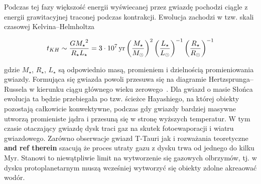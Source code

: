 Podczas tej fazy większość energii wyświecanej przez gwiazdę pochodzi ciągle z
energii grawitacyjnej traconej podczas kontrakcji. Ewolucja zachodzi w tzw.
skali czasowej Kelvina--Helmholtza 

\begin{equation} 
   t_{KH} \sim  \frac{G{M_{\star}}^2}{R_{\star}L_{\star}} = 3\cdot 10^7 \hbox{$\thinspace\textrm{yr}$}
   \left(\frac{M_\star}{M_\odot}\right)^{2}
   \left(\frac{L_\star}{L_\odot}\right)^{-1}
   \left(\frac{R_\star}{R_\odot}\right)^{-1}
\end{equation}

gdzie $M_{\star}$, $R_{\star}$, $L_{\star}$ są odpowiednio masą, promieniem i
dzielnością promieniowania gwiazdy. Formująca się gwiazda powoli przesuwa się na
diagramie Hertzsprunga--Russela w kierunku ciągu głównego wieku
zerowego~\cite{palla}.  Dla gwiazd o masie Słońca ewolucja ta będzie przebiegała
po tzw. ścieżce Hayashiego, na której obiekty pozostają całkowicie konwektywne,
podczas gdy gwiazdy bardziej masywne utworzą promieniste jądra i przesuną się
w stronę wyższych temperatur. W tym czasie otaczający gwiazdę dysk traci
gaz na skutek fotoewaporacji i wiatru gwiazdowego. Zarówno obserwacje gwiazd
T-Tauri jak i rozważania teoretyczne~\cite{alexanderpassuci2013} {\bf and ref
therein} szacują że proces utraty gazu z dysku trwa od jednego do kilku Myr.
Stanowi to niewątpliwie limit na wytworzenie się gazowych olbrzymów, tj. w dysku
protoplanetarnym muszą wcześniej wytworzyć się obiekty zdolne akreaować wodór.

